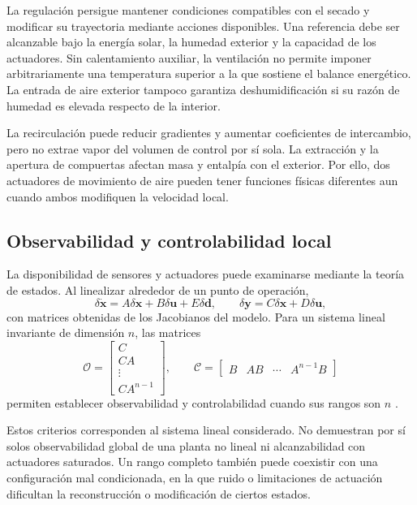 La regulación persigue mantener condiciones compatibles con el secado y modificar su trayectoria mediante acciones disponibles. Una referencia debe ser alcanzable bajo la energía solar, la humedad exterior y la capacidad de los actuadores. Sin calentamiento auxiliar, la ventilación no permite imponer arbitrariamente una temperatura superior a la que sostiene el balance energético. La entrada de aire exterior tampoco garantiza deshumidificación si su razón de humedad es elevada respecto de la interior.

La recirculación puede reducir gradientes y aumentar coeficientes de intercambio, pero no extrae vapor del volumen de control por sí sola. La extracción y la apertura de compuertas afectan masa y entalpía con el exterior. Por ello, dos actuadores de movimiento de aire pueden tener funciones físicas diferentes aun cuando ambos modifiquen la velocidad local.

\subsection{Observabilidad y controlabilidad local}

La disponibilidad de sensores y actuadores puede examinarse mediante la teoría de estados. Al linealizar alrededor de un punto de operación,
\begin{equation}
\delta\dot{\mathbf x}=A\delta\mathbf x+B\delta\mathbf u+E\delta\mathbf d,
\qquad
\delta\mathbf y=C\delta\mathbf x+D\delta\mathbf u,
\label{eq:linealizacion_control}
\end{equation}
con matrices obtenidas de los Jacobianos del modelo. Para un sistema lineal invariante de dimensión $n$, las matrices
\begin{equation}
\mathcal O=
\begin{bmatrix}C\\CA\\\vdots\\CA^{n-1}\end{bmatrix},
\qquad
\mathcal C=
\begin{bmatrix}B&AB&\cdots&A^{n-1}B\end{bmatrix}
\label{eq:observabilidad_controlabilidad}
\end{equation}
permiten establecer observabilidad y controlabilidad cuando sus rangos son $n$ \cite{astrom2008}.

Estos criterios corresponden al sistema lineal considerado. No demuestran por sí solos observabilidad global de una planta no lineal ni alcanzabilidad con actuadores saturados. Un rango completo también puede coexistir con una configuración mal condicionada, en la que ruido o limitaciones de actuación dificultan la reconstrucción o modificación de ciertos estados.

